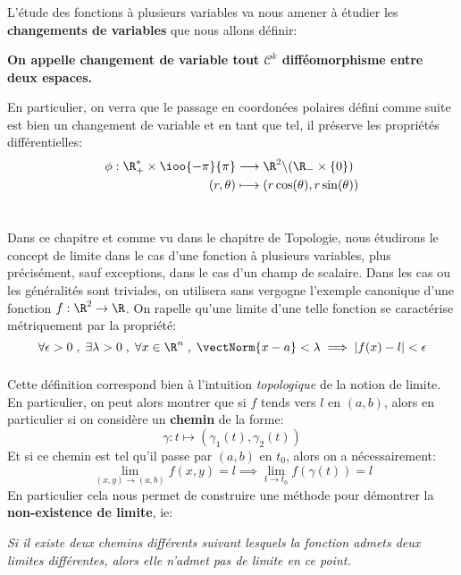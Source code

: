 \subsection*{}
L'étude des fonctions à plusieurs variables va nous amener à étudier les \textbf{changements de variables} que nous allons définir:
\begin{center}
   \textbf{On appelle changement de variable tout \(\mathcal{C}^k\) difféomorphisme entre deux espaces.}
\end{center}
En particulier, on verra que le passage en coordonées polaires défini comme suite est bien un changement de variable et en tant que tel, il préserve les propriétés différentielles:
\[
   \begin{aligned}
      \phi : \R_+^* \times \ioo{-\pi}{\pi} &\longrightarrow \R^2 \backslash (\R_- \times \{0\})\\
      (r, \theta) &\longmapsto (r\cos(\theta), r\sin(\theta))
   \end{aligned}
\]
\chapter*{}
Dans ce chapitre et comme vu dans le chapitre de Topologie, nous étudirons le concept de limite dans le cas d'une fonction à plusieurs variables, plus précisément, sauf exceptions, dans le cas d'un champ de scalaire. Dans les cas ou les généralités sont triviales, on utilisera sans vergogne l'exemple canonique d'une fonction \(f : \R^2 \rightarrow \R\). On rapelle qu'une limite d'une telle fonction se caractérise métriquement par la propriété:
\[
   \forall \epsilon >0 \; , \; \exists \lambda > 0 \; , \; \forall x \in \R^n \; , \; \vectNorm{x - a} < \lambda \implies |f(x) - l| < \epsilon
\]

\subsection*{}
Cette définition correspond bien à l'intuition \textit{topologique} de la notion de limite. En particulier, on peut alors montrer que si \(f\) tends vers \(l\) en \((a, b)\), alors en particulier si on considère un \textbf{chemin} de la forme:
\[
   \gamma : t \mapsto (\gamma_1(t), \gamma_2(t))   
\]
Et si ce chemin est tel qu'il passe par \((a, b)\) en \(t_0\), alors on a nécessairement:
\[
   \lim_{(x, y) \rightarrow (a, b)} f(x, y) = l \implies \lim_{t \rightarrow t_0} f(\gamma(t)) = l
\]
En particulier cela nous permet de construire une méthode pour démontrer la \textbf{non-existence de limite}, ie:
\begin{center}
   \textit{Si il existe deux chemins différents suivant lesquels la fonction admets deux limites différentes, alors elle n'admet pas de limite en ce point.}
\end{center}
